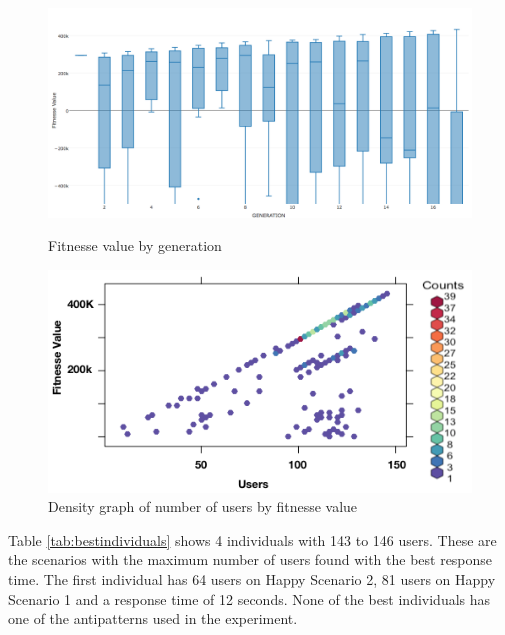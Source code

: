 \documentclass[times]{stvrauth}
\begin{document}
\begin{figure}[h]
\begin{minipage}{.5\textwidth}
\centering
\includegraphics[width=1\textwidth]{./images/experiment1-5.png}
\caption{Fitnesse value by generation}
\label{fig:summaryboxplot1}
\end{minipage}
\begin{minipage}{.5\textwidth}
\centering
\includegraphics[width=1\textwidth]{./images/experiment1-6.png}
\caption{Density graph of number of users by fitnesse value}
\label{fig:density1}
\end{minipage}
\end{figure}

Table \ref{tab:bestindividuals} shows 4 individuals with 143 to 146 users. These are the scenarios with the maximum number of users found with the best response time. The first individual has 64 users on Happy Scenario 2, 81 users on Happy Scenario 1 and a response time of 12 seconds. None of the best individuals has one of the antipatterns used in the experiment.
\end{document}
